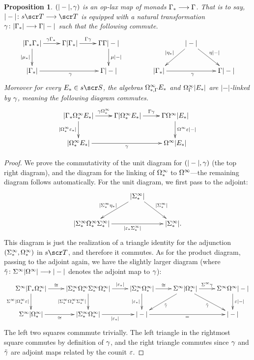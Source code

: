 \documentclass{amsart}
\newtheorem{prop}[thm]{Proposition}
\theoremstyle{definition}
\begin{document}
\begin{prop}\label{prop:linking}
    $(|-|,\gamma)$ is an op-lax map of monads $\Gamma_* \longrightarrow \Gamma$. That is to say, $|-| \colon s\sT \rtarr \sT$ is equipped with a natural transformation $\gamma \colon |\Gamma_*| \longrightarrow \Gamma|-|$ such that the following commute.
    \[
    \xymatrix{
        |\GA_* \GA_*| \ar[d]_{|\mu_*|} \ar[r]^{\ga \GA_*} & \GA |\GA_*| \ar[r]^-{\GA \ga} & \GA \GA |-| \ar[d]^{\mu |-|} \\
        |\GA_*| \ar[rr]_{\ga} && \GA|-|
    }
    \qquad \qquad
    \xymatrix{
        & |-| \ar[dl]_{|\et_*|}  \ar[dr]^{\et|-|} &\\
        |\GA_*| \ar[rr]_{\ga} & & \GA|-|
    }
    \]
    Moreover for every $E_* \in s\sS$, the algebras $\Omega^{\infty}_{*,\Gamma} E_*$ and $\Omega^{\infty}_{\Gamma}|E_*|$ are $|-|$-linked by $\gamma$, meaning the following diagram commutes.
    \[
    \xymatrix{
        |\GA_* \OM^{\infty}_* E_*| \ar[d]_{|\OM^{\infty}_*\epz_*|} \ar[r]^-{\ga \OM^{\infty}_*} & \GA |\OM^{\infty}_* E_*| \ar[r]^{\GA \ga} & \GA \OM^{\infty} |E_*| \ar[d]^{\OM^{\infty} \epz |-|} \\
        |\OM^{\infty}_* E_*| \ar[rr]_{\ga} && \OM^{\infty}|E_*|
    }
    \]
\end{prop}
\begin{proof}
    We prove the commutativity of the unit diagram for $(|-|,\gamma)$ (the top right diagram), and the diagram for the linking of $\Omega^{\infty}_*$ to $\Omega^{\infty}$---the remaining diagram follows automatically.
    For the unit diagram, we first pass to the adjoint:
    \[
    \xymatrix{
        & |\SI^{\infty}_*| \ar[dl]_{|\SI^{\infty}_* \et_*|} \ar[dr]^{|\SI^{\infty}_*|} &\\
        |\SI^{\infty}_* \OM^{\infty}_* \SI^{\infty}_*| \ar[rr]_{|\epz_* \SI^{\infty}_*|} && |\SI^{\infty}_*|.
    }
    \]
    \noindent This diagram is just the realization of a triangle identity for the adjunction $(\Sigma^{\infty}_*,\Omega^{\infty}_*)$ in $s\sT$, and therefore it commutes. As for the product diagram, passing to the adjoint again, we have the slightly larger diagram (where $\tilde{\gamma} \colon \Sigma^{\infty}|\Omega^{\infty}| \longrightarrow |-|$ denotes the adjoint map to $\gamma$):
    \[
    \xymatrix{
        \SI^{\infty}|\GA_* \OM^{\infty}_*| \ar[r]^-{\cong} \ar[d]_{\SI^{\infty}|\OM^{\infty}_* \epz|} & |\SI^{\infty}_* \OM^{\infty}_* \SI^{\infty}_* \OM^{\infty}_*| \ar[r]^-{|\epz_*|} \ar[d]_{|\SI^{\infty}_* \OM^{\infty}_* \SI^{\infty}_*|} & |\SI^{\infty}_* \OM^{\infty}_*| \ar[d]_{|\epz_*|} \ar[r]^{\cong} & \SI^{\infty}|\OM^{\infty}_*| \ar[r]^-{\SI^{\infty}\ga} \ar[dl]^{\tilde{\ga}} \ar[dr]_{\tilde{\ga}} & \SI^{\infty} \OM^{\infty}|-| \ar[d]^{\epz|-|} \\
        \SI^{\infty}|\OM^{\infty}_*| \ar[r]_{\cong} & |\SI^{\infty}_* \OM^{\infty}_*| \ar[r]_{|\epz_*|} & |-| \ar[rr]_{=} && |-|
    }
    \]
    The left two squares commmute trivially. The left triangle in the rightmost square commutes by definition of $\gamma$, and the right triangle commutes since $\gamma$ and $\tilde{\gamma}$ are adjoint maps related by the counit $\varepsilon$. 
\end{proof}
\end{document}
